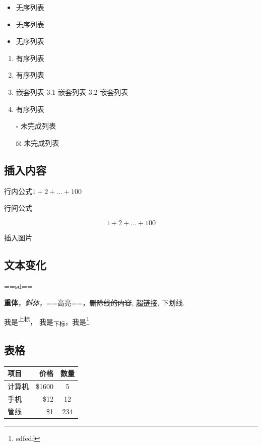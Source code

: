 \documentclass[]{book}
\providecommand{\tightlist}{%
  \setlength{\itemsep}{0pt}\setlength{\parskip}{0pt}}
\let\rmarkdownfootnote\footnote%
\def\footnote{\protect\rmarkdownfootnote}
\begin{document}
\begin{itemize}
\tightlist
\item
  无序列表
\item
  无序列表
\item
  无序列表
\end{itemize}

\begin{enumerate}
\def\labelenumi{\arabic{enumi}.}
\tightlist
\item
  有序列表
\item
  有序列表
\item
  嵌套列表
  3.1 嵌套列表
  3.2 嵌套列表
\item
  有序列表
\end{enumerate}

\begin{itemize}
\tightlist
\item[$\square$]
  未完成列表
\item[$\boxtimes$]
  未完成列表
\end{itemize}

\hypertarget{section-42}{%
\subsection{插入内容}\label{section-42}}

行内公式\(1+2+ \dots+100\)

行间公式

\[1+2+ \dots+100\]

插入图片

\hypertarget{section-43}{%
\subsection{文本变化}\label{section-43}}

==sd==

\textbf{重体}，\emph{斜体}，==高亮==，\sout{删除线的内容}, \href{www.genowis.con}{超链接}, 下划线.

我是\textsuperscript{上标}， 我是\textsubscript{下标}，我是\footnote{sdfedf}

\hypertarget{section-44}{%
\subsection{表格}\label{section-44}}

\begin{longtable}[]{@{}lrc@{}}
\toprule
项目 & 价格 & 数量\tabularnewline
\midrule
\endhead
计算机 & \$1600 & 5\tabularnewline
手机 & \$12 & 12\tabularnewline
管线 & \$1 & 234\tabularnewline
\bottomrule
\end{longtable}
\end{document}
